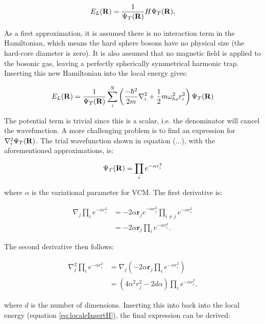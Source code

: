 \documentclass[english, a4paper]{article}
\newcommand\lr[1]{\left(#1\right)}
\newcommand{\bm}[1]{\mathbf{#1}}
\begin{document}
\begin{equation}
    E_L({\bf R})=\frac{1}{\Psi_T({\bf R})}H\Psi_T({\bf R}),
    \label{eq:locale}
\end{equation}

As a first approximation, it is assumed there is no interaction term in the Hamiltonian, which means the hard sphere bosons have no physical size (the hard-core diameter is zero). It is also assumed that no magnetic field is applied to the bosonic gas, leaving a perfectly spherically symmetrical harmonic trap. Inserting this new Hamiltonian into the local energy gives:

\begin{equation}
  E_L({\bf R})=\frac{1}{\Psi_T({\bf R})}\sum_i^N \left(
  \frac{-\hbar^2}{2m}
  \nabla_{i}^2 +
  \frac{1}{2}m\omega_{ho}^2r_i^2\right)\Psi_T({\bf R})
  \label{eq:localeInsertH}
\end{equation}

The potential term is trivial since this is a scalar, i.e. the denominator will cancel the wavefunction. A more challenging problem is to find an expression for $\nabla^2_i\Psi_T({\bf R})$. The trial wavefunction shown in equation (...), with the aforementioned approximations, is:

\begin{equation}
 \Psi_T({\bf R}) = \prod_i e^{-\alpha r_i^2}	\label{wavefunction_a}
\end{equation}

where $\alpha$ is the variational parameter for VCM. The first derivative is:

\begin{align}
 \nabla_j\prod_i e^{-\alpha r_i^2} 
 &= -2\alpha \bm{r}_j e^{-\alpha r_j^2} \prod_{i \neq j} e^{-\alpha r_i^2}\\
 &= -2\alpha \bm{r}_j  \prod_i e^{-\alpha r_i^2}.
 \label{E_L_first_derivative}
\end{align}

The second derivative then follows:

\begin{align}
 \nabla_j^2 \prod_i e^{-\alpha r_i^2} 
 &= \nabla_j \lr{-2\alpha \bm{r}_j  \prod_i e^{-\alpha r_i^2}}\\
 &= \lr{4\alpha^2 r_j^2 - 2d\alpha}  \prod_i e^{-\alpha r_i^2}.	\label{simpleLaplacian}
\end{align}

where $d$ is the number of dimensions. Inserting this into back into the local energy (equation \eqref{eq:localeInsertH}), the final expression can be derived:
\end{document}
